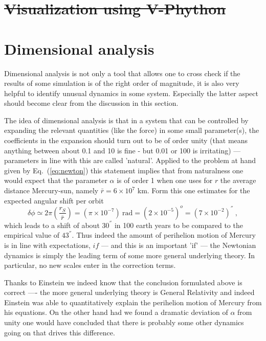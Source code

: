 \documentclass[12pt]{iopart}
\providecommand{\DIFdel}[1]{{\protect\color{red}\sout{#1}}}                      %
\providecommand{\DIFdelend}{} %
\DeclareRobustCommand{\DIFdelend}{\DIFOaddend \let\includegraphics\DIFOincludegraphics} %
\begin{document}
\section{\DIFdel{Visualization using V-Phython}}
\addtocounter{section}{-1}%
\DIFdelend 


\section{Dimensional analysis}

Dimensional analysis is not only a tool that allows one to cross check if the results of some simulation is
of the right order of magnitude, it is also very helpful to identify unusual dynamics in some system.
Especially the latter aspect should become clear from the discussion in this section.

The idea of dimensional analysis is that in a system that can be controlled by expanding the relevant quantities
(like the force) in some small parameter(s), the coefficients in the expansion should turn out to be of order unity (that
means anything between about 0.1 and 10 is fine - but 0.01 or 100 is irritating) --- parameters in line with this
are called 'natural'. Applied to the problem at hand
given by Eq.~(\ref{eq:newton}) this statement implies that from naturalness one would expect that 
the parameter $\alpha$ is of order 1 when one uses
for $r$ the average distance Mercury-sun, namely $\bar r=6\times 10^7$ km.
Form this one estimates for the expected angular shift per orbit
\begin{equation}
\delta \phi \simeq 2\pi\left(\frac{r_S}{\bar r}\right) = (\pi \times 10^{-7}) \ \mbox{rad} = (2\times 10^{-5})^o = (7\times 10^{-2}) ^{''} \ ,
\end{equation}
which leads to a shift of  about $30^{''}$ in 100 earth years to be compared to the empirical value of $43^{''}$.
 Thus indeed the
amount of perihelion motion of Mercury is in line with expectations, $if$ --- and this is an important 'if' ---
the Newtonian dynamics is simply the leading term of some more general underlying theory. In particular,
no new scales enter in the correction terms.

Thanks to Einstein we indeed know that the conclusion formulated above is correct ---- the more general underlying
theory is General Relativity and indeed Einstein was able to quantitatively explain the perihelion motion of Mercury
from his equations. 
On the other hand had we found a dramatic deviation of $\alpha$ from unity one would have concluded that 
there is probably some other dynamics going on that drives this difference.
\end{document}
